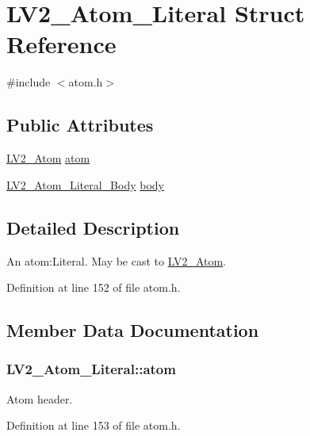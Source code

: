 \hypertarget{struct_l_v2___atom___literal}{}\section{L\+V2\+\_\+\+Atom\+\_\+\+Literal Struct Reference}
\label{struct_l_v2___atom___literal}


{\ttfamily \#include $<$atom.\+h$>$}

\subsection*{Public Attributes}
\begin{DoxyCompactItemize}
\item 
\hyperlink{struct_l_v2___atom}{L\+V2\+\_\+\+Atom} \hyperlink{struct_l_v2___atom___literal_a7026df9734fc22a5e6ee8acdd9ee15cf}{atom}
\item 
\hyperlink{struct_l_v2___atom___literal___body}{L\+V2\+\_\+\+Atom\+\_\+\+Literal\+\_\+\+Body} \hyperlink{struct_l_v2___atom___literal_aee17071e3ad4d2ae5918573cbcb0dbea}{body}
\end{DoxyCompactItemize}


\subsection{Detailed Description}
An atom\+:Literal. May be cast to \hyperlink{struct_l_v2___atom}{L\+V2\+\_\+\+Atom}. 

Definition at line 152 of file atom.\+h.



\subsection{Member Data Documentation}
\subsubsection[{\texorpdfstring{atom}{atom}}]{ L\+V2\+\_\+\+Atom\+\_\+\+Literal\+::atom}\hypertarget{struct_l_v2___atom___literal_a7026df9734fc22a5e6ee8acdd9ee15cf}{}\label{struct_l_v2___atom___literal_a7026df9734fc22a5e6ee8acdd9ee15cf}
Atom header. 

Definition at line 153 of file atom.\+h.

